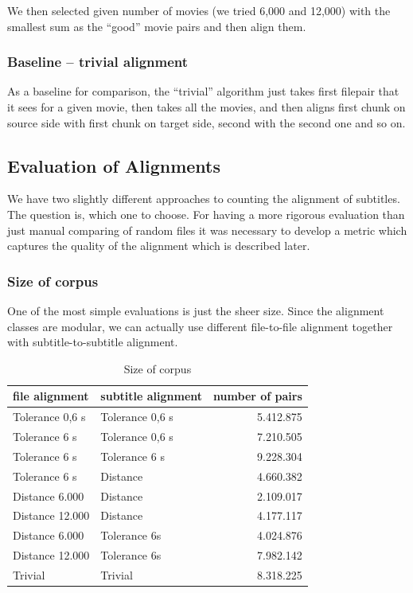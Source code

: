 We then selected given number of movies (we tried 6,000 and 12,000) with the smallest sum as the ``good'' movie pairs and then align them.

\subsubsection{Baseline -- trivial alignment}
As a baseline for comparison, the ``trivial'' algorithm just takes first filepair that it sees for a given movie, then takes all the movies, and then aligns first chunk on source side with first chunk on target side, second with the second one and so on.

\subsection{Evaluation of Alignments}
We have two slightly different approaches to counting the alignment of subtitles. The question is, which one to choose. For having a more rigorous evaluation than just manual comparing of random files it was necessary to develop a metric which captures the quality of the alignment which is described later.

\subsubsection{Size of corpus}
One of the most simple evaluations is just the sheer size. Since the alignment classes are modular, we can actually use different file-to-file alignment together with subtitle-to-subtitle alignment.

\begin{table}[h]
\begin{center}
\begin{tabular}{|l|l|r|}
    \hline
    \textbf{file alignment} & \textbf{subtitle alignment} & \textbf{number of pairs} \\ \hline
    Tolerance 0,6 s & Tolerance 0,6 s & 5.412.875 \\ \hline
    Tolerance 6 s & Tolerance 0,6 s & 7.210.505 \\  \hline
    Tolerance 6 s & Tolerance 6 s & 9.228.304 \\ \hline
    Tolerance 6 s & Distance & 4.660.382 \\ \hline
    Distance 6.000 & Distance & 2.109.017 \\ \hline
    Distance 12.000 & Distance & 4.177.117 \\ \hline
    Distance 6.000 & Tolerance 6s & 4.024.876 \\ \hline
    Distance 12.000 & Tolerance 6s & 7.982.142 \\ \hline
    Trivial & Trivial & 8.318.225 \\ \hline
    
\end{tabular}
\end{center}

\caption{Size of corpus}\label{corpusize}
\end{table}

